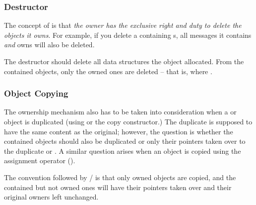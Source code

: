 \subsubsection{Destructor}
\label{sec:sim-lib:ownership-and-container-destructor}

The concept of  is that \textit{the owner has the
exclusive right and duty to delete the objects it owns}.
For example, if you delete a  containing s,
all messages it contains \textit{and} owns will also be deleted.

The destructor should delete all data structures the object allocated.
From the contained objects, only the owned ones are deleted -- that is,
where .


\subsubsection{Object Copying}
\label{sec:sim-lib:ownership-and-object-copying}

The ownership mechanism also has to be taken into consideration
when a  or  object is duplicated
(using  or the copy constructor.)
The duplicate is supposed to have the same content as the
original; however, the question is whether the contained objects
should also be duplicated or only their pointers taken over
to the duplicate  or . A similar
question arises when an object is copied using the assignment operator
().

The convention followed by / is that
only owned objects are copied, and the contained but not owned ones
will have their pointers taken over and their original owners
left unchanged.


%
%
%
%
%
%
%


